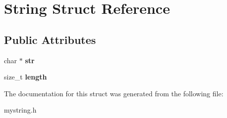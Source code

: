 \hypertarget{structString}{}\section{String Struct Reference}
\label{structString}
\subsection*{Public Attributes}
\begin{DoxyCompactItemize}
\item 
\hypertarget{structString_a7028cb0053f3138200b398a23ad2f2b8}{}char $\ast$ {\bfseries str}\label{structString_a7028cb0053f3138200b398a23ad2f2b8}

\item 
\hypertarget{structString_a31777c715e346f23259735e98d8cec7a}{}size\+\_\+t {\bfseries length}\label{structString_a31777c715e346f23259735e98d8cec7a}

\end{DoxyCompactItemize}


The documentation for this struct was generated from the following file\+:\begin{DoxyCompactItemize}
\item 
mystring.\+h\end{DoxyCompactItemize}
